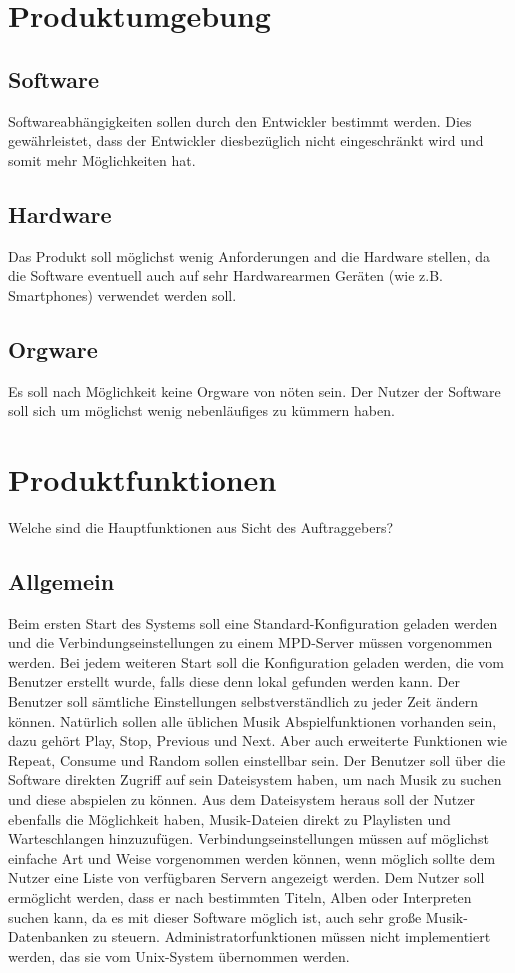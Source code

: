 \section{Produktumgebung}
\subsection{Software}
Softwareabhängigkeiten sollen durch den Entwickler bestimmt werden.
Dies gewährleistet, dass der Entwickler diesbezüglich nicht eingeschränkt wird
und somit mehr Möglichkeiten hat.
\subsection{Hardware}
Das Produkt soll möglichst wenig Anforderungen and die Hardware stellen, da
die Software eventuell auch auf sehr Hardwarearmen Geräten (wie z.B. Smartphones)
verwendet werden soll.
\subsection{Orgware}
Es soll nach Möglichkeit keine Orgware von nöten sein. Der Nutzer der Software soll sich
um möglichst wenig nebenläufiges zu kümmern haben.
\section{Produktfunktionen}
Welche sind die Hauptfunktionen aus Sicht des Auftraggebers?
\subsection{Allgemein}
Beim ersten Start des Systems soll eine Standard-Konfiguration geladen werden und die Verbindungseinstellungen
zu einem MPD-Server müssen vorgenommen werden. Bei jedem weiteren Start soll die Konfiguration geladen werden,
die vom Benutzer erstellt wurde, falls diese denn lokal gefunden werden kann. Der Benutzer soll sämtliche
Einstellungen selbstverständlich zu jeder Zeit ändern können.
Natürlich sollen alle üblichen Musik Abspielfunktionen vorhanden sein, dazu gehört Play, Stop, Previous
und Next. Aber auch erweiterte Funktionen wie Repeat, Consume und Random sollen einstellbar sein.
Der Benutzer soll über die Software direkten Zugriff auf sein Dateisystem haben, um nach Musik zu suchen und
diese abspielen zu können. Aus dem Dateisystem heraus soll der Nutzer ebenfalls die Möglichkeit haben, Musik-Dateien
direkt zu Playlisten und Warteschlangen hinzuzufügen.
Verbindungseinstellungen müssen auf möglichst einfache Art und Weise vorgenommen werden können, wenn möglich
sollte dem Nutzer eine Liste von verfügbaren Servern angezeigt werden. 
Dem Nutzer soll ermöglicht werden, dass er nach bestimmten Titeln, Alben oder Interpreten suchen kann, da 
es mit dieser Software möglich ist, auch sehr große Musik-Datenbanken zu steuern.
Administratorfunktionen müssen nicht implementiert werden, das sie vom Unix-System übernommen werden.
